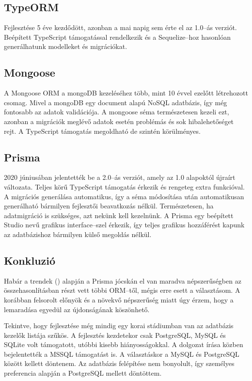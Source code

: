 \subsection{TypeORM}
Fejlesztése 5 éve kezdődött, azonban a mai napig sem érte el az 1.0–ás verziót.
Beépített TypeScript támogatással rendelkezik és a Sequelize–hoz hasonlóan generálhatunk modelleket és migrációkat.\cite{TypeORM}


\subsection{Mongoose}
A Mongoose ORM a mongoDB kezeléséhez több, mint 10 évvel ezelőtt létrehozott csomag. 
Mivel a mongoDB egy document alapú NoSQL adatbázis, így még fontosabb az adatok validációja.\cite{Mongoose}
A mongoose séma természetesen kezeli ezt, azonban a migrációk meglévő adatok esetén problémás és sok hibalehetőséget rejt.
A TypeScript támogatás megoldható de szintén körülményes.

\subsection{Prisma}
2020 júniusában jelentették be a 2.0–ás verziót, amely az 1.0 alapoktól újraírt változata.
Teljes körű TypeScript támogatás érkezik és rengeteg extra funkcióval.
A migrációs generálása automatikus, így a séma módosítása után automatikusan generálható bármilyen fejlesztői beavatkozás nélkül.
Természetesen, ha adatmigráció is szükséges, azt nekünk kell kezelnünk.
A Prisma egy beépített Studio nevű grafikus interface–szel érkezik, így teljes grafikus hozzáférést kapunk az adatbázishoz bármilyen külső megoldás nélkül.


\subsection{Konkluzió}
Habár a trendek () alapján a Prisma jócskán el van maradva népszerűségben az összehasonlításban részt vett többi ORM–től, mégis erre esett a választásom.
A korábban felsorolt előnyök és a növekvő népszerűség miatt úgy érzem, hogy a lemaradása egyedül az újdonságának köszönhető.

Tekintve, hogy fejlesztése még mindig egy korai stádiumban van az adatbázis kezelők listája szűkös.
A fejlesztés kezdetekor csak PostgreSQL, MySQL és SQLite volt támogatott, utóbbi kisebb hiányosságokkal.
A dolgozat írása közben bejelentették a MSSQL támogatást is. 
A választáskor a MySQL és PostgreSQL között kellett döntenem.
Az adatbázis felépítése nem bonyolult, így személyes preferencia alapján a PostgreSQL mellett döntöttem.

